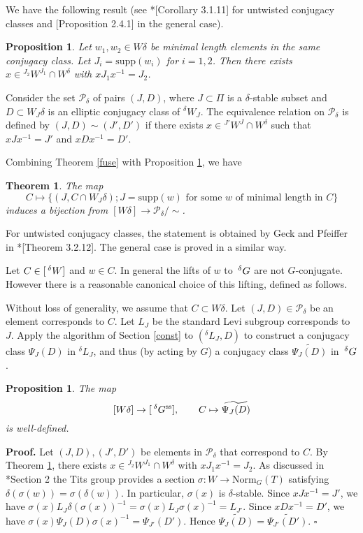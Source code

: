 \documentclass[10pt,leqno]{article}
\newtheorem{theorem}[equation]{Theorem}
\newtheorem{proposition}[equation]{Proposition}
\newcommand{\qed}{\hfill $\square$ \medskip}
\newenvironment{proof}[1][Proof]{\noindent\textbf{#1.} }{\qed}
\newcommand{\Norm}{\text{Norm}}
\renewcommand{\ss}{\text{ss}}
\newcommand{\Wext}{\negthinspace\negthinspace\phantom{a}^\delta W}
\newcommand{\Gext}{\negthinspace\negthinspace\phantom{a}^\delta G}
\begin{document}
We have the following result (see \cite{geck_pfeiffer}*[Corollary
3.1.11] for untwisted conjugacy classes and \cite{CH}[Proposition
2.4.1] in the general case).

\begin{proposition}\label{x-delta}
	Let $w_1, w_2 \in W\delta$ be minimal length elements in the same conjugacy class. Let $J_i=\text{supp}(w_i)$ for $i=1,2$. Then there exists $x \in {}^{J_2} W^{J_1} \cap W^\delta$ with $x J_1 x^{-1}=J_2$. 
\end{proposition}

Consider the set $\mathcal P_{\delta}$ of pairs $(J, D)$, where $J \subset \Pi$ is a $\delta$-stable subset and $D \subset W_J \delta$ is an elliptic conjugacy class of ${}^\delta W_J$. The equivalence relation on $\mathcal P_{\delta}$ is defined by $(J, D) \sim (J', D')$ if there exists $x \in {}^{J'} W^J \cap W^\delta$ such that $x J x^{-1}=J'$ and $x D x^{-1}=D'$. 

Combining Theorem \ref{fuse} with Proposition \ref{x-delta}, we have 

\begin{theorem}\label{cal-P}
	The map $$C \mapsto \{(J, C \cap W_J \delta); J=\text{supp}(w) \text{ for some } w \text{ of minimal length in } C\}$$ induces a bijection from $[W\delta] \to \mathcal P_{\delta}/\sim$. 
\end{theorem}

For untwisted conjugacy classes, the statement is obtained by Geck and
Pfeiffer in \cite{geck_pfeiffer}*[Theorem 3.2.12]. The general case is
proved in a similar way.

Let $C\in [\Wext]$ and $w \in C$. In general the lifts of $w$ to $\Gext$ are not $G$-conjugate. However there is a reasonable canonical choice of this lifting, defined as follows.

Without loss of generality, we assume that $C \subset W \delta$. Let $(J, D) \in \mathcal P_{\delta}$ be an element corresponds to $C$. Let $L_J$ be the standard Levi subgroup corresponds to $J$.  Apply the algorithm of Section \ref{const} to $({}^\delta L_J, D)$ to construct a conjugacy class $\Psi_J(D)$ in ${}^\delta L_J$, and thus (by acting by $G$) a conjugacy class $\widetilde{\Psi_J(D)}$ in $\Gext$.

\begin{proposition} The map $$[W \delta] \to [\Gext^{\ss}], \qquad C \mapsto \widetilde{\Psi_J(D)}$$ is well-defined. 
\end{proposition}

\begin{proof}
	Let $(J, D), (J', D')$ be elements in $\mathcal P_{\delta}$ that correspond to $C$. By Theorem \ref{cal-P}, there exists $x \in {}^{J_2} W^{J_1} \cap W^\delta$ with $x J_1 x^{-1}=J_2$. As discussed in \cite{AH}*{Section 2} the Tits group provides a section $\sigma:W\rightarrow \Norm_G(T)$ satisfying
	$\delta(\sigma(w))=\sigma(\delta(w))$. In particular, $\sigma(x)$ is $\delta$-stable. Since $x J x^{-1}=J'$, we have $\sigma(x) L_J \delta(\sigma(x))^{-1}=\sigma(x) L_J \sigma(x)^{-1}=L_{J'}$. Since $x D x^{-1}=D'$, we have $\sigma(x) \Psi_J(D) \sigma(x)^{-1}=\Psi_{J'}(D')$. Hence $\widetilde{\Psi_J(D)}=\widetilde{\Psi_{J'}(D')}$. 
\end{proof}
\end{document}
